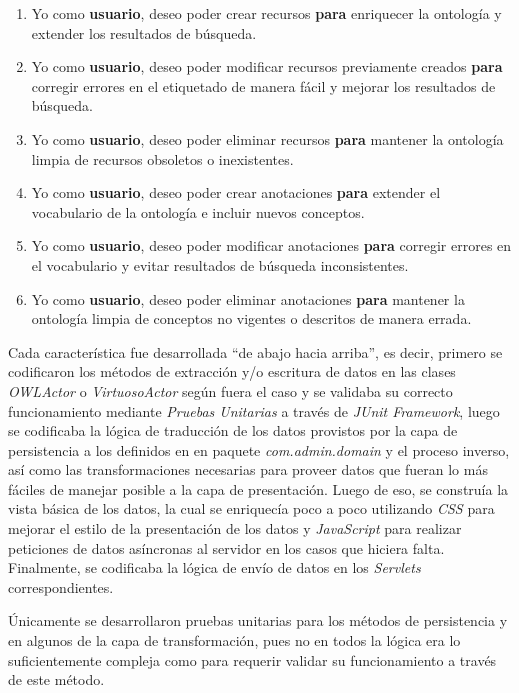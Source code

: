 \begin{itemize}
\begin{enumerate}
    \item Yo como \textbf{usuario}, deseo poder crear recursos \textbf{para} enriquecer la ontología y extender los resultados de búsqueda.
    \item Yo como \textbf{usuario}, deseo poder modificar recursos previamente creados \textbf{para} corregir errores en el etiquetado de manera fácil y mejorar los resultados de búsqueda.
    \item Yo como \textbf{usuario}, deseo poder eliminar recursos \textbf{para} mantener la ontología limpia de recursos obsoletos o inexistentes.
    \item Yo como \textbf{usuario}, deseo poder crear anotaciones \textbf{para} extender el vocabulario de la ontología e incluir nuevos conceptos.
    \item Yo como \textbf{usuario}, deseo poder modificar anotaciones \textbf{para} corregir errores en el vocabulario y evitar resultados de búsqueda inconsistentes.
    \item Yo como \textbf{usuario}, deseo poder eliminar anotaciones \textbf{para} mantener la ontología limpia de conceptos no vigentes o descritos de manera errada.
\end{enumerate}

Cada característica fue desarrollada ``de abajo hacia arriba'', es decir, primero se codificaron los métodos de extracción y/o escritura de datos en las clases \textit{OWLActor} o \textit{VirtuosoActor} según fuera el caso y se validaba su correcto funcionamiento mediante \textit{Pruebas Unitarias} a través de \textit{JUnit Framework}, luego se codificaba la lógica de traducción de los datos provistos por la capa de persistencia a los definidos en en paquete \textit{com.admin.domain} y el proceso inverso, así como las transformaciones necesarias para proveer datos que fueran lo más fáciles de manejar posible a la capa de presentación. Luego de eso, se construía la vista básica de los datos, la cual se enriquecía poco a poco utilizando \textit{CSS} para mejorar el estilo de la presentación de los datos y \textit{JavaScript} para realizar peticiones de datos asíncronas al servidor en los casos que hiciera falta. Finalmente, se codificaba la lógica de envío de datos en los \textit{Servlets} correspondientes.

Únicamente se desarrollaron pruebas unitarias para los métodos de persistencia y en algunos de la capa de transformación, pues no en todos la lógica era lo suficientemente compleja como para requerir validar su funcionamiento a través de este método.


\end{itemize}
